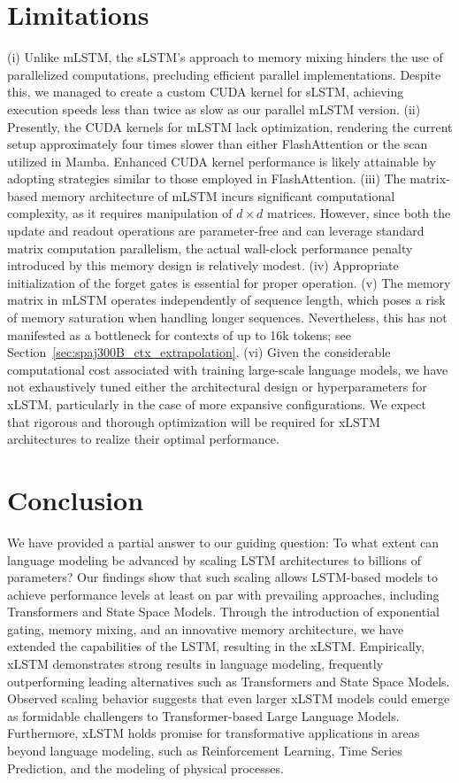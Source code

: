 \section{Limitations}

(i) Unlike mLSTM, the sLSTM’s approach to memory mixing hinders the use of parallelized computations, precluding efficient parallel implementations. Despite this, we managed to create a custom CUDA kernel for sLSTM, achieving execution speeds less than twice as slow as our parallel mLSTM version. (ii) Presently, the CUDA kernels for mLSTM lack optimization, rendering the current setup approximately four times slower than either FlashAttention or the scan utilized in Mamba. Enhanced CUDA kernel performance is likely attainable by adopting strategies similar to those employed in FlashAttention. (iii) The matrix-based memory architecture of mLSTM incurs significant computational complexity, as it requires manipulation of $d \times d$ matrices. However, since both the update and readout operations are parameter-free and can leverage standard matrix computation parallelism, the actual wall-clock performance penalty introduced by this memory design is relatively modest. (iv) Appropriate initialization of the forget gates is essential for proper operation. (v) The memory matrix in mLSTM operates independently of sequence length, which poses a risk of memory saturation when handling longer sequences. Nevertheless, this has not manifested as a bottleneck for contexts of up to 16k tokens; see Section~\ref{sec:spaj300B_ctx_extrapolation}. (vi) Given the considerable computational cost associated with training large-scale language models, we have not exhaustively tuned either the architectural design or hyperparameters for xLSTM, particularly in the case of more expansive configurations. We expect that rigorous and thorough optimization will be required for xLSTM architectures to realize their optimal performance.

\section{Conclusion}
We have provided a partial answer to our guiding question: To what extent can language modeling be advanced by scaling LSTM architectures to billions of parameters? Our findings show that such scaling allows LSTM-based models to achieve performance levels at least on par with prevailing approaches, including Transformers and State Space Models. Through the introduction of exponential gating, memory mixing, and an innovative memory architecture, we have extended the capabilities of the LSTM, resulting in the xLSTM. Empirically, xLSTM demonstrates strong results in language modeling, frequently outperforming leading alternatives such as Transformers and State Space Models. Observed scaling behavior suggests that even larger xLSTM models could emerge as formidable challengers to Transformer-based Large Language Models. Furthermore, xLSTM holds promise for transformative applications in areas beyond language modeling, such as Reinforcement Learning, Time Series Prediction, and the modeling of physical processes.

